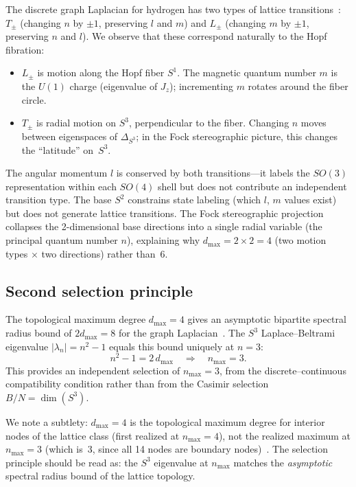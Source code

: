 \documentclass[aps,prl,twocolumn,superscriptaddress]{revtex4-2}
\begin{document}
The discrete graph Laplacian for hydrogen has two types of lattice
transitions~\cite{phase2_kappa}: $T_\pm$ (changing $n$ by $\pm 1$,
preserving $l$ and $m$) and $L_\pm$ (changing $m$ by $\pm 1$, preserving
$n$ and $l$). We observe that these correspond naturally to the Hopf
fibration:
\begin{itemize}
\item $L_\pm$ is motion along the Hopf fiber $S^1$. The magnetic quantum
  number $m$ is the $U(1)$ charge (eigenvalue of $J_z$); incrementing
  $m$ rotates around the fiber circle.
\item $T_\pm$ is radial motion on $S^3$, perpendicular to the fiber.
  Changing $n$ moves between eigenspaces of $\Delta_{S^3}$; in the Fock
  stereographic picture, this changes the ``latitude'' on~$S^3$.
\end{itemize}
The angular momentum $l$ is conserved by both transitions---it labels
the $SO(3)$ representation within each $SO(4)$ shell but does not
contribute an independent transition type. The base $S^2$ constrains
state labeling (which $l$, $m$ values exist) but does not generate
lattice transitions. The Fock stereographic projection collapses the
2-dimensional base directions into a single radial variable (the
principal quantum number $n$), explaining why $d_{\max} = 2 \times 2 = 4$
(two motion types $\times$ two directions) rather than~6.


\subsection{Second selection principle}\label{sec:second_selection}

The topological maximum degree $d_{\max} = 4$ gives an asymptotic
bipartite spectral radius bound of $2 d_{\max} = 8$ for the graph
Laplacian~\cite{phase1_kappa}. The $S^3$ Laplace--Beltrami eigenvalue
$|\lambda_n| = n^2 - 1$ equals this bound uniquely at $n = 3$:
\begin{equation}\label{eq:second_selection}
  n^2 - 1 = 2\,d_{\max} \quad\Longrightarrow\quad n_{\max} = 3.
\end{equation}
This provides an independent selection of $n_{\max} = 3$, from the
discrete--continuous compatibility condition rather than from the Casimir
selection $B/N = \dim(S^3)$.

We note a subtlety: $d_{\max} = 4$ is the topological maximum degree for
interior nodes of the lattice class (first realized at $n_{\max} = 4$),
not the realized maximum at $n_{\max} = 3$ (which is~$3$, since all 14
nodes are boundary nodes)~\cite{phase2_kappa}. The selection principle
should be read as: the $S^3$ eigenvalue at $n_{\max}$ matches the
\textit{asymptotic} spectral radius bound of the lattice topology.
\end{document}
